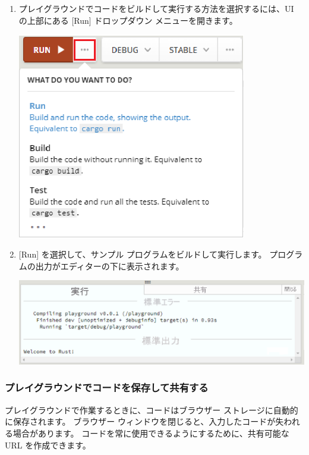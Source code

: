 \begin{enumerate}
\item プレイグラウンドでコードをビルドして実行する方法を選択するには、UI の上部にある [Run] ドロップダウン メニューを開きます。

\includegraphics[width=10cm]{rust-playground-run.eps}

\item $[$Run] を選択して、サンプル プログラムをビルドして実行します。 プログラムの出力がエディターの下に表示されます。

\includegraphics[width=14cm]{rust-playground-print.eps}

\end{enumerate}

\subsubsection{プレイグラウンドでコードを保存して共有する}

プレイグラウンドで作業するときに、コードはブラウザー ストレージに自動的に保存されます。 ブラウザー ウィンドウを閉じると、入力したコードが失われる場合があります。 コードを常に使用できるようにするために、共有可能な URL を作成できます。

